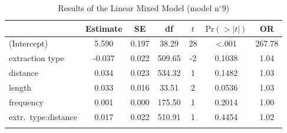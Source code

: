 \begin{table}
\begin{tabularx}{\textwidth}{Q 
                  S[table-format=-1.3] 
                  S[table-format=1.3] 
                  S[table-format=3.2] 
                  S[table-format=-1] 
                  S[table-format=<1.4] 
                  S[table-format=3.2]}
  \lsptoprule
 & {Estimate} & {SE} & {df} & {$t$} & {$\text{Pr}(>|t|)$} & {OR} \\ 
  \midrule
(Intercept) & 5.590 & 0.197 & 38.29 & 28 & <.001 & 267.78 \\ 
  extraction type & -0.037 & 0.022 & 509.65 & -2 & 0.1038 & 1.04 \\ 
  distance & 0.034 & 0.023 & 534.32 & 1 & 0.1482 & 1.03 \\ 
  length & 0.033 & 0.016 & 33.51 & 2 & 0.0536 & 1.03 \\ 
  frequency & 0.001 & 0.000 & 175.50 & 1 & 0.2014 & 1.00 \\ 
  extr.\ type:distance & 0.017 & 0.022 & 510.91 & 1 & 0.4454 & 1.02 \\ 
   \lspbottomrule
\end{tabularx}
\caption{Results of the Linear Mixed Model (model n$^{\circ}$9)}
\label{tab:exp03-m9}
\end{table}
